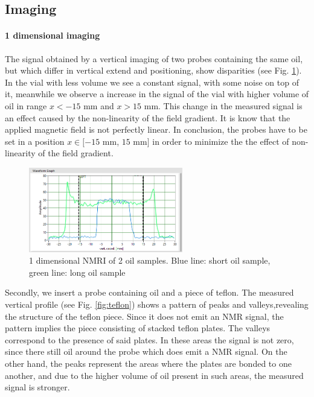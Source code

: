 \subsection{Imaging}
\paragraph{1 dimensional imaging}
The signal obtained by a vertical imaging of two probes containing the same oil, but which differ in vertical extend and positioning, show disparities (see Fig. \ref{fig: long and short oil}). In the vial with less volume we see a constant signal, with some noise on top of it, meanwhile we observe a increase in the signal of the vial with higher volume of oil in range $x < -15$ mm and $x > 15$ mm. This change in the measured signal is an effect caused by the non-linearity of the field gradient. It is know that the applied magnetic field is not perfectly linear. In conclusion, the probes have to be set in a position $x \in [-15$ mm, $15$ mm$]$ in order to minimize the the effect of non-linearity of the field gradient. 
\begin{figure}[!htbp]
  \begin{center}
    \includegraphics[width= 0.6\textwidth]{./Protocol images/III/long&short_signal.png}
 \caption{1 dimensional NMRI of 2 oil samples. Blue line: short oil sample, green line: long oil sample}
    \label{fig: long and short oil}
   \end{center}
 \end{figure} 
 
Secondly, we insert a probe containing oil and a piece of teflon. The measured vertical profile (see Fig. \ref{fig:teflon}) shows a pattern of peaks and valleys,revealing the structure of the teflon piece. Since it does not emit an NMR signal, the pattern implies the piece consisting of stacked teflon plates. The valleys correspond to the presence of said plates. In these areas the signal is not zero, since there still oil around the probe which does emit a NMR signal. On the other hand, the peaks represent the areas where the plates are bonded to one another, and due to the higher volume of oil present in such areas, the measured signal is stronger.  

